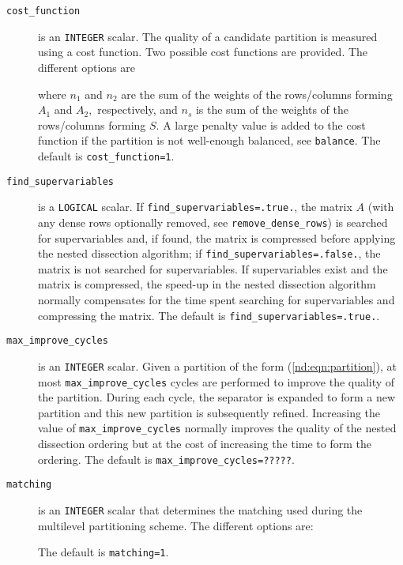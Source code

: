 \begin{description}
\item[\texttt{cost\_function}] is an {\tt INTEGER} scalar. The quality of a candidate 
 partition is measured using a cost function. Two possible 
 cost functions are provided. The different options are 
 where $n_1$ and $n_2$ are the sum of the weights of the rows/columns forming 
 $A_1$ and $A_2,$ respectively, and $n_s$ is the sum of the weights of the 
 rows/columns forming $S.$ A large penalty value is added to the cost function if the 
partition is not well-enough balanced, see {\tt balance}. The default is {\tt cost\_function=1}.

\item[\texttt{find\_supervariables}] is a {\tt LOGICAL} scalar. If 
{\tt find\_supervariables=.true.}, the matrix $A$ (with any dense rows 
optionally removed, see {\tt remove\_dense\_rows}) is searched for 
supervariables and, if found, the matrix is compressed before applying the 
nested dissection algorithm; if {\tt find\_supervariables=.false.}, the matrix 
is not searched for supervariables. If supervariables exist and the matrix is 
compressed, the speed-up in the nested dissection algorithm normally 
compensates for the time spent searching for supervariables and compressing the 
matrix. The default is {\tt find\_supervariables=.true.}.

\item[\texttt{max\_improve\_cycles}] is an {\tt INTEGER} scalar. Given a partition of the 
form (\ref{nd:eqn:partition}), at most {\tt max\_improve\_cycles} cycles are 
performed to improve the quality of the partition. During each cycle, the 
separator is expanded to form a new partition and this new partition is 
subsequently refined. Increasing the value of {\tt max\_improve\_cycles} normally improves 
the quality of the nested dissection ordering but at the cost of increasing the 
time to form the ordering. The default is {\tt max\_improve\_cycles=?????}.

\item[\texttt{matching}] is an {\tt INTEGER} scalar that determines the matching used during the multilevel partitioning scheme. The different options are: 
The default is {\tt matching=1}.




\end{description}
